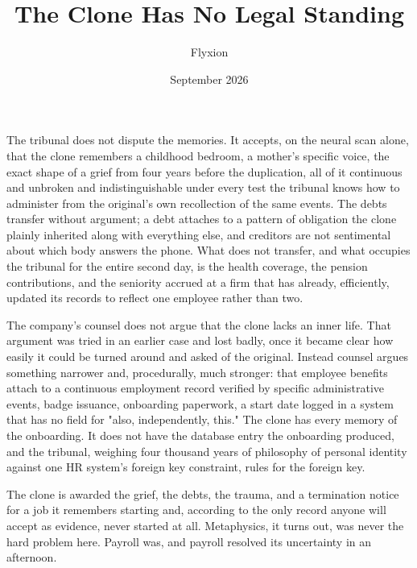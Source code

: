 \documentclass[11pt]{article}
\title{The Clone Has No Legal Standing}
\author{Flyxion}
\date{September 2026}
\begin{document}
\maketitle

The tribunal does not dispute the memories. It accepts, on the neural scan alone, that the clone remembers a childhood bedroom, a mother's specific voice, the exact shape of a grief from four years before the duplication, all of it continuous and unbroken and indistinguishable under every test the tribunal knows how to administer from the original's own recollection of the same events. The debts transfer without argument; a debt attaches to a pattern of obligation the clone plainly inherited along with everything else, and creditors are not sentimental about which body answers the phone. What does not transfer, and what occupies the tribunal for the entire second day, is the health coverage, the pension contributions, and the seniority accrued at a firm that has already, efficiently, updated its records to reflect one employee rather than two.

The company's counsel does not argue that the clone lacks an inner life. That argument was tried in an earlier case and lost badly, once it became clear how easily it could be turned around and asked of the original. Instead counsel argues something narrower and, procedurally, much stronger: that employee benefits attach to a continuous employment record verified by specific administrative events, badge issuance, onboarding paperwork, a start date logged in a system that has no field for "also, independently, this." The clone has every memory of the onboarding. It does not have the database entry the onboarding produced, and the tribunal, weighing four thousand years of philosophy of personal identity against one HR system's foreign key constraint, rules for the foreign key.

The clone is awarded the grief, the debts, the trauma, and a termination notice for a job it remembers starting and, according to the only record anyone will accept as evidence, never started at all. Metaphysics, it turns out, was never the hard problem here. Payroll was, and payroll resolved its uncertainty in an afternoon.
\end{document}
